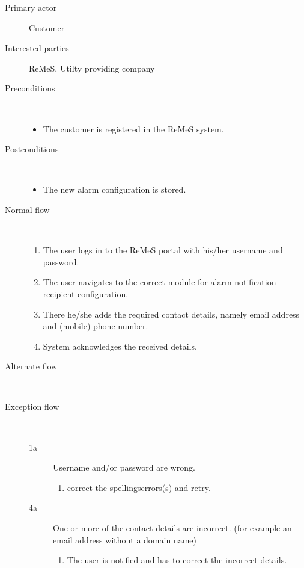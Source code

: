 \begin{description}
	\item[Primary actor] Customer
	\item[Interested parties] ReMeS, Utilty providing company
	\item[Preconditions] \ 
	\begin{itemize}
		\item The customer is registered in the ReMeS system.
	\end{itemize}
	\item[Postconditions] \ 
	\begin{itemize}
		\item The new alarm configuration is stored.
	\end{itemize}
	\item[Normal flow] \ 
	\begin{enumerate}
	  	\item The user logs in to the ReMeS portal with his/her username and
	  	password.
	  	\item The user navigates to the correct module for alarm
	  	notification recipient configuration.
	  	\item There he/she adds the required contact details, namely email address
	  	and (mobile) phone number.
	  	\item System acknowledges the received details.
	\end{enumerate}
	\item[Alternate flow] \ 
	\begin{description}
		\item
	\end{description}
	\item[Exception flow] \ 
	\begin{description}
		\item[1a] Username and/or password are wrong.
		\begin{enumerate}
		  \item correct the spellingserrors(s) and retry. %
		\end{enumerate}
		\item[4a] One or more of the contact details are incorrect. (for example an
		email address without a domain name)
		\begin{enumerate}
		  \item The user is notified and has to correct the incorrect details.
		\end{enumerate}
	\end{description}
\end{description}